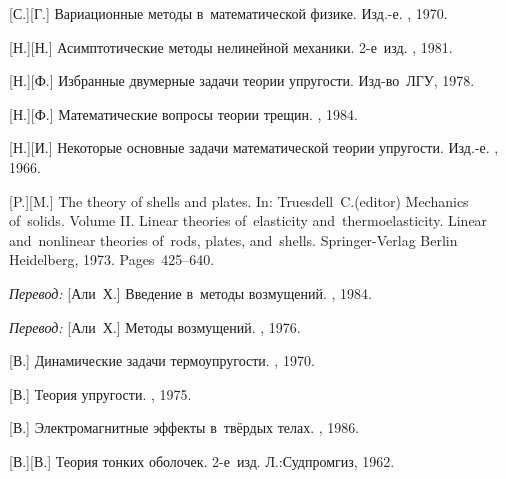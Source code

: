 \begin{thebibliography}{123}
\begin{otherlanguage}{russian}
[С.][Г.] Вариационные методы в~математической физике. Изд.\hbox{-}е. \naukapublisher, 1970. 

[Н.][Н.] Асимптотические методы нелинейной механики. 2\hbox{-}е~изд. \naukapublisher, 1981. 

[Н.][Ф.] Избранные двумерные задачи теории упругости. Изд\hbox{-}во~ЛГУ, 1978. 

[Н.][Ф.] Математические вопросы теории трещин. \naukapublisher, 1984. 

[Н.][И.] Некоторые основные задачи математической теории упругости. Изд.\hbox{-}е. \naukapublisher, 1966. 

[P.][M.] The theory of shells and plates. In: Truesdell~C.\:(editor) Mechanics of~solids. Volume II. Linear theories of~elasticity and~thermoelasticity. Linear and~nonlinear theories of~rods, plates, and~shells. Springer\hbox{-}Verlag Berlin Heidelberg, 1973. Pages~425\hbox{--}640.

\emph{Перевод:} [Али~Х.] Введение в~методы возмущений. \mirpublisher, 1984. 

\emph{Перевод:} [Али~Х.] Методы возмущений. \mirpublisher, 1976. 

[В.] Динамические задачи термоупругости. \mirpublisher, 1970. 

[В.] Теория упругости. \mirpublisher, 1975. 

[В.] Электромагнитные эффекты в~твёрдых телах. \mirpublisher, 1986. 

[В.][В.] Теория тонких оболочек. 2\hbox{-}е~изд. Л.:\;Судпромгиз, 1962. 


\end{otherlanguage}
\end{thebibliography}
